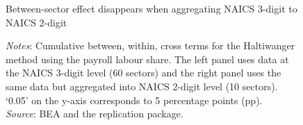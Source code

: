 \begin{figure}[h]
  \centering
  \caption{\normalsize Between-sector effect disappears when aggregating NAICS 3-digit to NAICS 2-digit}
\vfill
\begin{minipage}{\linewidth}
\captionsetup{justification=raggedright,singlelinecheck=false}
    \caption*{\textit{Notes}: Cumulative between, within, cross terms for the Haltiwanger method using the payroll labour share. The left panel uses data at the NAICS 3-digit level (60 sectors) and the right panel uses the same data but aggregated into NAICS 2-digit level (10 sectors). `0.05' on the y-axis corresponds to 5 percentage points (pp). \\
    \textit{Source}: BEA and the \citet{elsbyDeclineLaborShare2013a} replication package.}
\end{minipage}
\label{fig:minormajor}
\end{figure}